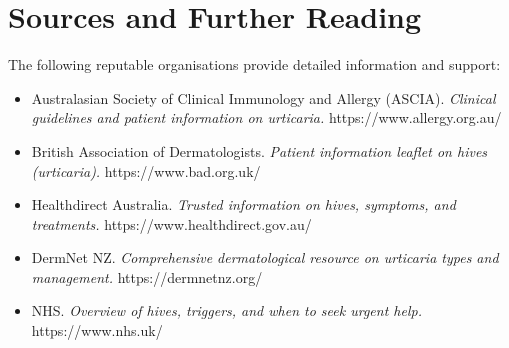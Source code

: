 \section*{Sources and Further Reading}
The following reputable organisations provide detailed information and support:
\begin{itemize}
    \item Australasian Society of Clinical Immunology and Allergy (ASCIA). \textit{Clinical guidelines and patient information on urticaria.} https://www.allergy.org.au/
    \item British Association of Dermatologists. \textit{Patient information leaflet on hives (urticaria).} https://www.bad.org.uk/
    \item Healthdirect Australia. \textit{Trusted information on hives, symptoms, and treatments.} https://www.healthdirect.gov.au/
    \item DermNet NZ. \textit{Comprehensive dermatological resource on urticaria types and management.} https://dermnetnz.org/
    \item NHS. \textit{Overview of hives, triggers, and when to seek urgent help.} https://www.nhs.uk/
\end{itemize}
